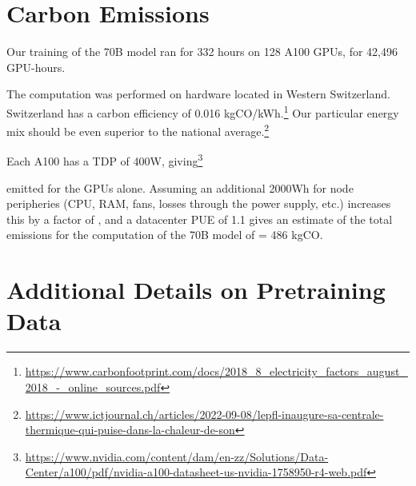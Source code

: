 \documentclass{article}
\begin{document}



\clearpage
\appendix

\section{Carbon Emissions} 

Our training of the 70B model ran for 332 hours on 128 A100 GPUs, for 42,496 GPU-hours.

The computation was performed on hardware located in Western Switzerland. 
Switzerland has a carbon efficiency of 0.016 kgCO/kWh.\footnote{\url{https://www.carbonfootprint.com/docs/2018_8_electricity_factors_august_2018_-_online_sources.pdf}} Our particular energy mix should be even superior to the national average.\footnote{\url{https://www.ictjournal.ch/articles/2022-09-08/lepfl-inaugure-sa-centrale-thermique-qui-puise-dans-la-chaleur-de-son}}

Each A100 has a TDP of 400W, giving\footnote{\url{https://www.nvidia.com/content/dam/en-zz/Solutions/Data-Center/a100/pdf/nvidia-a100-datasheet-us-nvidia-1758950-r4-web.pdf}}



emitted for the GPUs alone. Assuming an additional 2000Wh for node peripheries (CPU, RAM, fans, losses through the power supply, etc.) increases this by a factor of , and a datacenter PUE of 1.1 gives an estimate of the total emissions for the computation of the 70B model of  = 486 kgCO.


\section{Additional Details on Pretraining Data}
\end{document}
